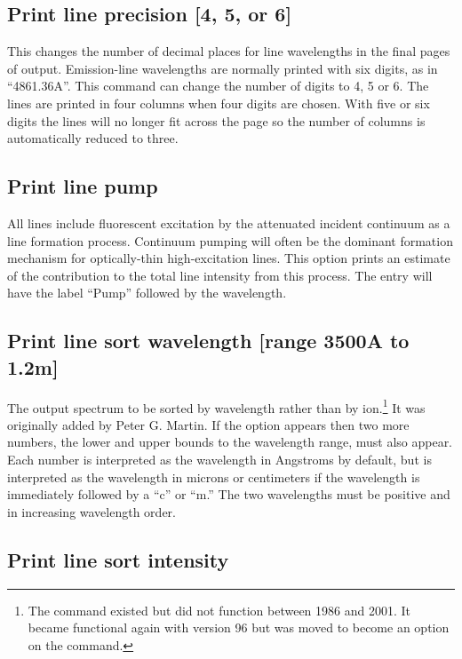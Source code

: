 \subsection{Print line precision [4, 5, or 6]}

This changes the number of decimal places for line wavelengths in the final pages of
output.
Emission-line wavelengths are normally printed with six digits,
as in ``4861.36A''.
This command can change the number of digits to 4, 5 or 6.
The lines are printed in four columns when four digits are chosen.
With five or six digits the lines will no longer fit across the page so
the number of columns is automatically reduced to three.


\subsection{Print line pump}

All lines include fluorescent excitation by the attenuated incident
continuum as a line formation process.
Continuum pumping will often be
the dominant formation mechanism for optically-thin high-excitation lines.
This option prints an estimate of the contribution to the total line
intensity from this process.
The entry will have the label ``Pump'' followed by the wavelength.

\subsection{Print line sort wavelength [range 3500A to 1.2m]}

The output spectrum to be sorted by wavelength rather than by
ion.\footnote{The  command existed but did not function between 1986
and 2001.  It became functional again with version 96 but was moved to become
an option on the  command.}
It was originally added by Peter G. Martin.
If the  option appears
then two more numbers, the lower and upper bounds to the wavelength range,
must also appear.
Each number is interpreted as the wavelength in Angstroms
by default, but is interpreted as the wavelength in microns or centimeters
if the wavelength is immediately followed by a ``c'' or ``m.''
The two
wavelengths must be positive and in increasing wavelength order.

\subsection{Print line sort intensity}

